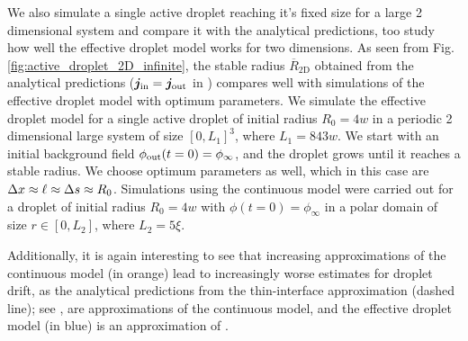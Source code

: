 We also simulate a single active droplet reaching it's fixed size for a large 2 dimensional system and compare it with the analytical predictions, too study how well the effective droplet model works for two dimensions.
As seen from Fig. \ref{fig:active_droplet_2D_infinite}, the stable radius $\overline{R}_\mathrm{2D}$ obtained from the analytical predictions ($\boldsymbol{j}_\mathrm{in} = \boldsymbol{j}_\mathrm{out}$ in ) compares well with simulations of the effective droplet model with optimum parameters.
We simulate the effective droplet model for a single active droplet of initial radius $R_0 = 4w$ in a periodic 2 dimensional large system of size $[0, L_1]^3$, where $L_1 = 843w$.
We start with an initial background field $\phi_\mathrm{out}(t=0) = \phi_\infty$, and the droplet grows until it reaches a stable radius.
We choose optimum parameters as well, which in this case are $\Delta x \approx \ell \approx \Delta s \approx R_0$.
Simulations using the continuous model were carried out for a droplet of initial radius $R_0 = 4w$ with $\phi(t=0) = \phi_\infty$ in a polar domain of size $r \in [0, L_2]$, where $L_2 = 5 \xi$.

Additionally, it is again interesting to see that increasing approximations of the continuous model (in orange) lead to increasingly worse estimates for droplet drift, as the analytical predictions from the thin-interface approximation (dashed line); see , are approximations of the continuous model, and the effective droplet model (in blue) is an approximation of .

